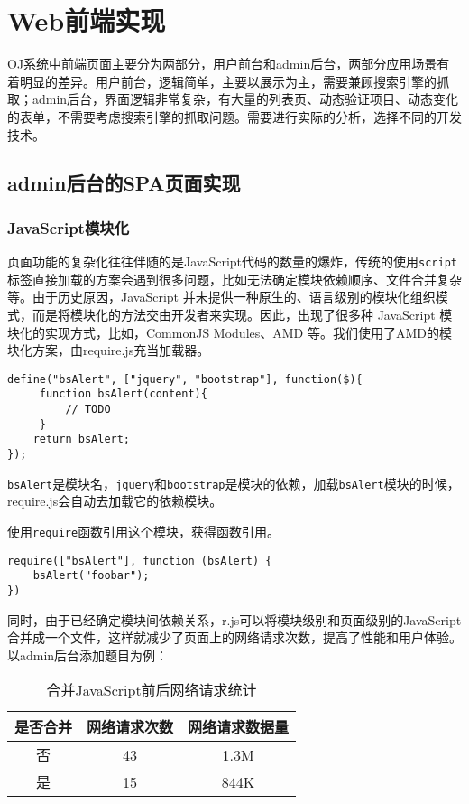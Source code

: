 \section{Web前端实现}

OJ系统中前端页面主要分为两部分，用户前台和admin后台，两部分应用场景有着明显的差异。用户前台，逻辑简单，主要以展示为主，需要兼顾搜索引擎的抓取；admin后台，界面逻辑非常复杂，有大量的列表页、动态验证项目、动态变化的表单，不需要考虑搜索引擎的抓取问题。需要进行实际的分析，选择不同的开发技术。

\subsection{admin后台的SPA页面实现}

\subsubsection{JavaScript模块化}

页面功能的复杂化往往伴随的是JavaScript代码的数量的爆炸，传统的使用\texttt{script}标签直接加载的方案会遇到很多问题，比如无法确定模块依赖顺序、文件合并复杂等。由于历史原因，JavaScript 并未提供一种原生的、语言级别的模块化组织模式，而是将模块化的方法交由开发者来实现。因此，出现了很多种 JavaScript 模块化的实现方式，比如，CommonJS Modules、AMD 等。我们使用了AMD的模块化方案，由require.js充当加载器\cite{js-module}。

\begin{verbatim}
define("bsAlert", ["jquery", "bootstrap"], function($){
     function bsAlert(content){
         // TODO
     }
    return bsAlert;
});
\end{verbatim}

\texttt{bsAlert}是模块名，\texttt{jquery}和\texttt{bootstrap}是模块的依赖，加载\texttt{bsAlert}模块的时候，require.js会自动去加载它的依赖模块。

使用\texttt{require}函数引用这个模块，获得函数引用。

\begin{verbatim}
require(["bsAlert"], function (bsAlert) {
    bsAlert("foobar");
})
\end{verbatim}

同时，由于已经确定模块间依赖关系，r.js可以将模块级别和页面级别的JavaScript合并成一个文件，这样就减少了页面上的网络请求次数，提高了性能和用户体验。以admin后台添加题目为例：

\begin{table}[H]
\centering  %
\caption{合并JavaScript前后网络请求统计}
\begin{tabular}{|c|c|c|}  %
\hline
是否合并 &网络请求次数 &网络请求数据量\\ \hline  %
否 &43 &1.3M\\         %
\hline
是 &15 &844K\\
\hline
\end{tabular}
\end{table}

